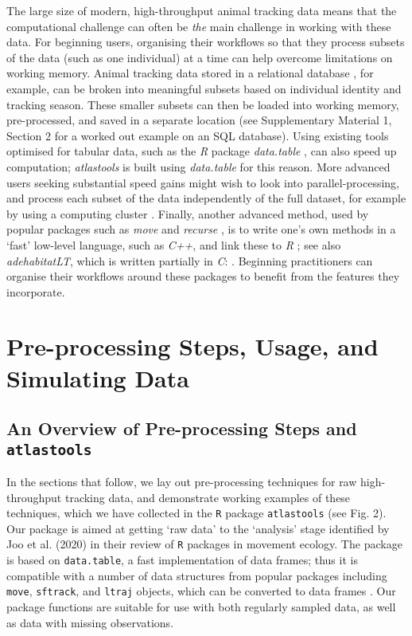 \begin{refsection}
    The large size of modern, high-throughput animal tracking data means that the computational challenge can often be \textit{the} main challenge in working with these data.
    For beginning users, organising their workflows so that they process subsets of the data (such as one individual) at a time can help overcome limitations on working memory.
    Animal tracking data stored in a relational database \cite[e.g. SQL databases][]{codd1970}, for example, can be broken into meaningful subsets based on individual identity and tracking season.
    These smaller subsets can then be loaded into working memory, pre-processed, and saved in a separate location (see Supplementary Material 1, Section 2 for a worked out example on an SQL database).
    Using existing tools optimised for tabular data, such as the \textit{R} package \textit{data.table} \cite{dowle2020}, can also speed up computation; \textit{atlastools} is built using \textit{data.table} for this reason.
    More advanced users seeking substantial speed gains might wish to look into parallel-processing, and process each subset of the data independently of the full dataset, for example by using a computing cluster \cite[see also][for an alternative]{zjdai2021}.
    Finally, another advanced method, used by popular packages such as \textit{move} \cite{kranstauber2011} and \textit{recurse} \cite{bracis2018}, is to write one's own methods in a `fast' low-level language, such as \textit{C++}, and link these to \textit{R} \cite[][]{eddelbuettel2013}; see also \textit{adehabitatLT}, which is written partially in \textit{C}: \cite{calenge2006}.
    Beginning practitioners can organise their workflows around these packages to benefit from the features they incorporate.

    \section*{Pre-processing Steps, Usage, and Simulating Data}

    \subsection*{An Overview of Pre-processing Steps and \texttt{atlastools}}

    In the sections that follow, we lay out pre-processing techniques for raw high-throughput tracking data, and demonstrate working examples of these techniques, which we have collected in the \texttt{R} package \texttt{atlastools} (see Fig. 2).
    Our package is aimed at getting `raw data' to the `analysis' stage identified by Joo et al. (2020) in their review of \texttt{R} packages in movement ecology.
    The package is based on \texttt{data.table}, a fast implementation of data frames; thus it is compatible with a number of data structures from popular packages including \texttt{move}, \texttt{sftrack}, and \texttt{ltraj} objects, which can be converted to data frames \citep[][]{kranstauber2011,boone2020,calenge2009}.
    Our package functions are suitable for use with both regularly sampled data, as well as data with missing observations.


\end{refsection}
